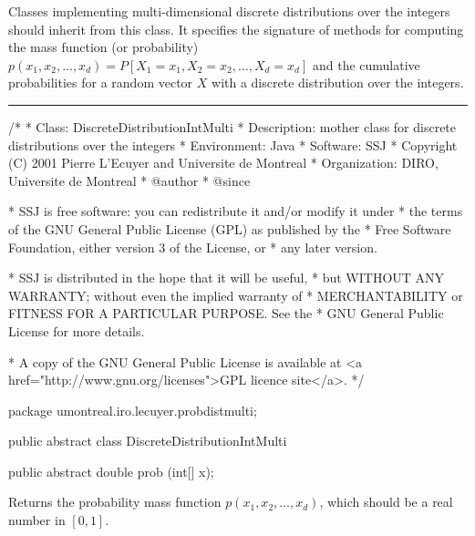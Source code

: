 
Classes implementing multi-dimensional discrete distributions over the integers
should inherit from this class.
It specifies the signature of methods for computing the mass function
(or probability) $p(x_1, x_2, \ldots, x_d) = 
 P[X_1 = x_1, X_2 = x_2, \ldots, X_d = x_d]$ and the cumulative probabilities 
for a random vector $X$ with a discrete distribution over the integers.

\bigskip\hrule

\begin{code}
\begin{hide}
/*
 * Class:        DiscreteDistributionIntMulti
 * Description:  mother class for discrete distributions over the integers
 * Environment:  Java
 * Software:     SSJ 
 * Copyright (C) 2001  Pierre L'Ecuyer and Universite de Montreal
 * Organization: DIRO, Universite de Montreal
 * @author       
 * @since

 * SSJ is free software: you can redistribute it and/or modify it under
 * the terms of the GNU General Public License (GPL) as published by the
 * Free Software Foundation, either version 3 of the License, or
 * any later version.

 * SSJ is distributed in the hope that it will be useful,
 * but WITHOUT ANY WARRANTY; without even the implied warranty of
 * MERCHANTABILITY or FITNESS FOR A PARTICULAR PURPOSE.  See the
 * GNU General Public License for more details.

 * A copy of the GNU General Public License is available at
   <a href="http://www.gnu.org/licenses">GPL licence site</a>.
 */
\end{hide}
package umontreal.iro.lecuyer.probdistmulti;


public abstract class DiscreteDistributionIntMulti\begin{hide} {
   protected int dimension;
  \end{hide}

   public abstract double prob (int[] x);
\end{code}
\begin{tabb}  Returns the probability mass function $p(x_1, x_2, \ldots, x_d)$,
   which should be a real number in $[0,1]$.
\end{tabb}
\begin{htmlonly}
\end{htmlonly}
